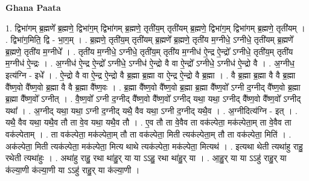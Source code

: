 \documentclass[17pt]{extarticle}
\begin{document}
\textbf{Ghana Paata } \newline

1. द्विभा॑गम् ब्र॒ह्मणे᳚ ब्र॒ह्मणे॒ द्विभा॑ग॒म् द्विभा॑गम् ब्र॒ह्मणे॒ तृती॑य॒म् तृती॑यम् ब्र॒ह्मणे॒ द्विभा॑ग॒म् द्विभा॑गम् ब्र॒ह्मणे॒ तृती॑यम् । . द्विभा॑ग॒मिति॒ द्वि - भा॒ग॒म् । . ब्र॒ह्मणे॒ तृती॑य॒म् तृती॑यम् ब्र॒ह्मणे᳚ ब्र॒ह्मणे॒ तृती॑य म॒ग्नीधे॒ ऽग्नीधे॒ तृती॑यम् ब्र॒ह्मणे᳚ ब्र॒ह्मणे॒ तृती॑य म॒ग्नीधे᳚ । . तृती॑य म॒ग्नीधे॒ ऽग्नीधे॒ तृती॑य॒म् तृती॑य म॒ग्नीध॑ ऐ॒न्द्र ऐ॒न्द्रो᳚ ऽग्नीधे॒ तृती॑य॒म् तृती॑य म॒ग्नीध॑ ऐ॒न्द्रः । . अ॒ग्नीध॑ ऐ॒न्द्र ऐ॒न्द्रो᳚ ऽग्नीधे॒ ऽग्नीध॑ ऐ॒न्द्रो वै वा ऐ॒न्द्रो᳚ ऽग्नीधे॒ ऽग्नीध॑ ऐ॒न्द्रो वै । . अ॒ग्नीध॒ इत्य॑ग्नि - इधे᳚ । . ऐ॒न्द्रो वै वा ऐ॒न्द्र ऐ॒न्द्रो वै ब्र॒ह्मा ब्र॒ह्मा वा ऐ॒न्द्र ऐ॒न्द्रो वै ब्र॒ह्मा । . वै ब्र॒ह्मा ब्र॒ह्मा वै वै ब्र॒ह्मा वै᳚ष्ण॒वो वै᳚ष्ण॒वो ब्र॒ह्मा वै वै ब्र॒ह्मा वै᳚ष्ण॒वः । . ब्र॒ह्मा वै᳚ष्ण॒वो वै᳚ष्ण॒वो ब्र॒ह्मा ब्र॒ह्मा वै᳚ष्ण॒वो᳚ ऽग्नी द॒ग्नीद् वै᳚ष्ण॒वो ब्र॒ह्मा ब्र॒ह्मा वै᳚ष्ण॒वो᳚ ऽग्नीत् । . वै॒ष्ण॒वो᳚ ऽग्नी द॒ग्नीद् वै᳚ष्ण॒वो वै᳚ष्ण॒वो᳚ ऽग्नीद् यथा॒ यथा॒ ऽग्नीद् वै᳚ष्ण॒वो वै᳚ष्ण॒वो᳚ ऽग्नीद् यथा᳚ । . अ॒ग्नीद् यथा॒ यथा॒ ऽग्नी द॒ग्नीद् यथै॒ वैव यथा॒ ऽग्नी द॒ग्नीद् यथै॒व । . अ॒ग्नीदित्य॑ग्नि - इत् । . यथै॒ वैव यथा॒ यथै॒व तौ ता वे॒व यथा॒ यथै॒व तौ । . ए॒व तौ ता वे॒वैव ता वक॑ल्पेता॒ मक॑ल्पेता॒म् ता वे॒वैव ता वक॑ल्पेताम् । . ता वक॑ल्पेता॒ मक॑ल्पेता॒म् तौ ता वक॑ल्पेता॒ मिती त्यक॑ल्पेता॒म् तौ ता वक॑ल्पेता॒ मिति॑ । . अक॑ल्पेता॒ मिती त्यक॑ल्पेता॒ मक॑ल्पेता॒ मित्य थाथे त्यक॑ल्पेता॒ मक॑ल्पेता॒ मित्यथ॑ । . इत्यथा थेती त्यथा॑हु राहु॒ रथेती त्यथा॑हुः । . अथा॑हु राहु॒ रथा था॑हु॒र् या या ऽऽहु॒ रथा था॑हु॒र् या । . आ॒हु॒र् या या ऽऽहु॑ राहु॒र् या क॑ल्या॒णी क॑ल्या॒णी या ऽऽहु॑ राहु॒र् या क॑ल्या॒णी । \newline
\end{document}

